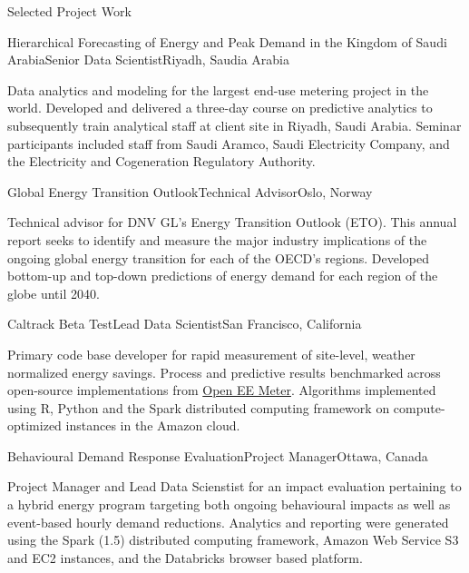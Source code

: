 \documentclass{resume} %
\begin{document}
\begin{rSection}{Selected Project Work}
\begin{rSubsection}{Hierarchical Forecasting of Energy and Peak Demand in the Kingdom of Saudi Arabia}{}{Senior Data Scientist}{Riyadh, Saudia Arabia}
\item[] Data analytics and modeling for the largest end-use metering project in the world. Developed and delivered a three-day course on predictive analytics to subsequently train analytical staff at client site in Riyadh, Saudi Arabia. Seminar participants included staff from Saudi Aramco, Saudi Electricity Company, and the Electricity and Cogeneration Regulatory Authority.

\end{rSubsection}


\begin{rSubsection}{Global Energy Transition Outlook}{}{Technical Advisor}{Oslo, Norway}
\item[] Technical advisor for DNV GL's Energy Transition Outlook (ETO). This annual report seeks to identify and measure the major industry implications of the ongoing global energy transition for each of the OECD's regions. Developed bottom-up and top-down predictions of energy demand for each region of the globe until 2040.
\end{rSubsection}

\begin{rSubsection}{Caltrack Beta Test}{}{Lead Data Scientist}{San Francisco, California}
\item[] Primary code base developer for rapid measurement of site-level, weather normalized energy savings. Process and predictive results benchmarked across open-source implementations from \href{https://github.com/impactlab/caltrack}{Open EE Meter}. Algorithms implemented using R, Python and the Spark distributed computing framework on compute-optimized instances in the Amazon cloud.
\end{rSubsection}

\begin{rSubsection}{Behavioural Demand Response Evaluation}{}{Project Manager}{Ottawa, Canada}
\item[] Project Manager and Lead Data Scienstist for an impact evaluation pertaining to a hybrid energy program targeting both ongoing behavioural impacts as well as event-based hourly demand reductions. Analytics and reporting were generated using the Spark (1.5) distributed computing framework, Amazon Web Service S3 and EC2 instances, and the Databricks browser based platform.


\end{rSubsection}
\end{rSection}
\end{document}
